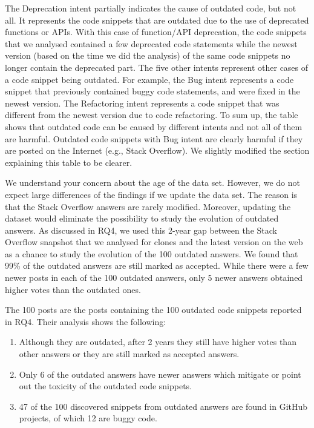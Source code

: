 \documentclass[a4paper,twoside,10pt]{reviewresponse}
\begin{document}
The Deprecation intent partially indicates the cause of outdated code, but not all. It represents the code snippets that are outdated due to the use of deprecated functions or APIs. With this case of function/API deprecation, the code snippets that we analysed contained a few deprecated code statements while the newest version (based on the time we did the analysis) of the same code snippets no longer contain the deprecated part. The five other intents represent other cases of a code snippet being outdated. For example, the Bug intent represents a code snippet that previously contained buggy code statements, and were fixed in the newest version. The Refactoring intent represents a code snippet that was different from the newest version due to code refactoring.
To sum up, the table shows that outdated code can be caused by different intents and not all of them are harmful. Outdated code snippets with Bug intent are clearly harmful if they are posted on the Internet (e.g., Stack Overflow). We slightly modified the section explaining this table to be clearer.


We understand your concern about the age of the data set. However, we do not expect large differences of the findings if we update the data set. The reason is that the Stack Overflow answers are rarely modified. Moreover, updating the dataset would eliminate the possibility to study the evolution of outdated answers. As discussed in RQ4, we used this 2-year gap between the Stack Overflow snapshot that we analysed for clones and the latest version on the web as a chance to study the evolution of the 100 outdated answers. We found that 99\% of the outdated answers are still marked as accepted. While there were a few newer posts in each of the 100 outdated answers, only 5 newer answers obtained higher votes than the outdated ones.

The 100 posts are the posts containing the 100 outdated code snippets reported in RQ4. Their analysis shows the following: 
\begin{enumerate}
	\item Although they are outdated, after 2 years they still have higher votes than other answers or they are still marked as accepted answers.
	\item Only 6 of the outdated answers have newer answers which mitigate or point out the toxicity of the outdated code snippets. 
	\item 47 of the 100 discovered snippets from outdated answers are found in GitHub projects, of which 12 are buggy code. 
\end{enumerate}
\end{document}
